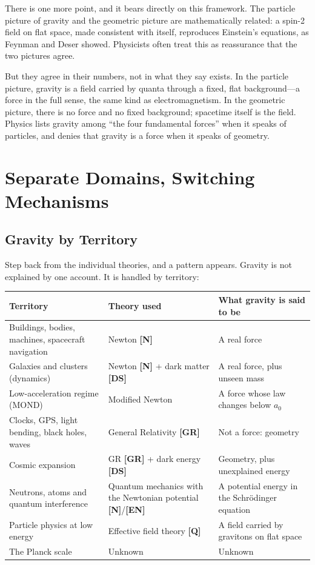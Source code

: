 \documentclass[11pt,a4paper]{article}
\newcommand{\reg}[1]{\textsf{\small\textbf{[#1]}}}
\newcommand{\RN}{\reg{N}}
\newcommand{\RGR}{\reg{GR}}
\newcommand{\REN}{\reg{EN}}
\newcommand{\RQ}{\reg{Q}}
\newcommand{\RDS}{\reg{DS}}
\begin{document}
There is one more point, and it bears directly on this framework. The particle picture of gravity and the geometric picture are mathematically related: a spin-2 field on flat space, made consistent with itself, reproduces Einstein's equations, as Feynman and Deser showed. Physicists often treat this as reassurance that the two pictures agree.

But they agree in their numbers, not in what they say exists. In the particle picture, gravity is a field carried by quanta through a fixed, flat background---a force in the full sense, the same kind as electromagnetism. In the geometric picture, there is no force and no fixed background; spacetime itself is the field. Physics lists gravity among ``the four fundamental forces'' when it speaks of particles, and denies that gravity is a force when it speaks of geometry. 

\section{Separate Domains, Switching Mechanisms}

\subsection{Gravity by Territory}

Step back from the individual theories, and a pattern appears. Gravity is not explained by one account. It is handled by territory:

\begin{longtable}{>{\raggedright\arraybackslash}p{4.2cm}>{\raggedright\arraybackslash}p{3.6cm}>{\raggedright\arraybackslash}p{6.0cm}}
\toprule
\textbf{Territory} & \textbf{Theory used} & \textbf{What gravity is said to be} \\
\midrule
\endhead
Buildings, bodies, machines, spacecraft navigation & Newton \RN{} & A real force \\
Galaxies and clusters (dynamics) & Newton \RN{} + dark matter \RDS{} & A real force, plus unseen mass \\
Low-acceleration regime (MOND) & Modified Newton & A force whose law changes below $a_0$ \\
Clocks, GPS, light bending, black holes, waves & General Relativity \RGR{} & Not a force: geometry \\
Cosmic expansion & GR \RGR{} + dark energy \RDS{} & Geometry, plus unexplained energy \\
Neutrons, atoms and quantum interference & Quantum mechanics with the Newtonian potential \RN{}/\REN{} & A potential energy in the Schr\"odinger equation \\
Particle physics at low energy & Effective field theory \RQ{} & A field carried by gravitons on flat space \\
The Planck scale & Unknown & Unknown \\
\bottomrule
\end{longtable}
\end{document}
